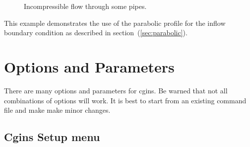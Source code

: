 \documentclass{article}
\newcommand{\solver}{cgins}
\begin{document}
{
\begin{figure}[hbt]
\newcommand{\figWidtha}{9.cm}
\newcommand{\trimfiga}[2]{\trimPlot{#1}{#2}{.0}{.0}{.0}{.025}}
\begin{center}
\end{center} 
\caption{Incompressible flow through some pipes.}
\end{figure}
}


% 
\noindent This example demonstrates the use of the parabolic profile for
the inflow boundary condition as described in section~(\ref{sec:parabolic}).


\clearpage



\clearpage




\clearpage
\section{Options and Parameters} \label{sec:parameters}

There are many options and parameters for \solver. Be warned that not all
combinations of options will work.  It is best to start from an existing command
file and make make minor changes.


\subsection{Cgins Setup menu}\label{sec:setupDialog}
\end{document}
